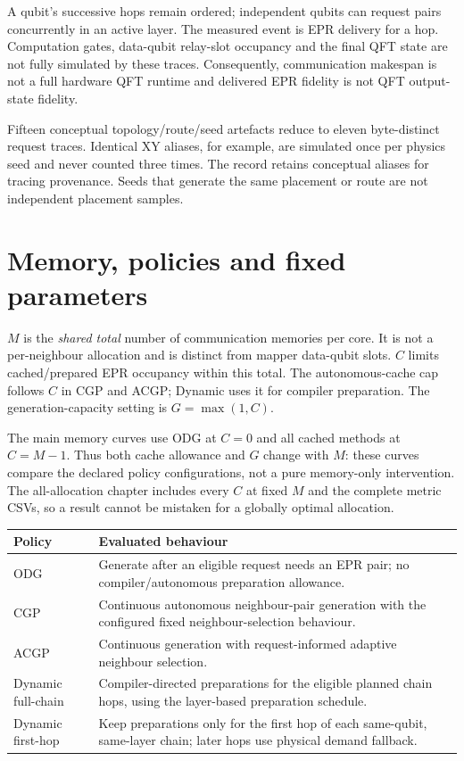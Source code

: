 \documentclass[10pt,a4paper,oneside]{report}
\begin{document}
A qubit's successive hops remain ordered; independent qubits can request pairs concurrently in an active layer. The measured event is EPR delivery for a hop. Computation gates, data-qubit relay-slot occupancy and the final QFT state are not fully simulated by these traces. Consequently, communication makespan is not a full hardware QFT runtime and delivered EPR fidelity is not QFT output-state fidelity.

Fifteen conceptual topology/route/seed artefacts reduce to eleven byte-distinct request traces. Identical XY aliases, for example, are simulated once per physics seed and never counted three times. The record retains conceptual aliases for tracing provenance. Seeds that generate the same placement or route are not independent placement samples.

\clearpage
\section{Memory, policies and fixed parameters}
$M$ is the \emph{shared total} number of communication memories per core. It is not a per-neighbour allocation and is distinct from mapper data-qubit slots. $C$ limits cached/prepared EPR occupancy within this total. The autonomous-cache cap follows $C$ in CGP and ACGP; Dynamic uses it for compiler preparation. The generation-capacity setting is $G=\max(1,C)$.

The main memory curves use ODG at $C=0$ and all cached methods at $C=M-1$. Thus both cache allowance and $G$ change with $M$: these curves compare the declared policy configurations, not a pure memory-only intervention. The all-allocation chapter includes every $C$ at fixed $M$ and the complete metric CSVs, so a result cannot be mistaken for a globally optimal allocation.

\begin{center}\small
\begin{tabular}{p{.22\linewidth}p{.68\linewidth}}\toprule
Policy & Evaluated behaviour\\\midrule
ODG & Generate after an eligible request needs an EPR pair; no compiler/autonomous preparation allowance.\\
CGP & Continuous autonomous neighbour-pair generation with the configured fixed neighbour-selection behaviour.\\
ACGP & Continuous generation with request-informed adaptive neighbour selection.\\
Dynamic full-chain & Compiler-directed preparations for the eligible planned chain hops, using the layer-based preparation schedule.\\
Dynamic first-hop & Keep preparations only for the first hop of each same-qubit, same-layer chain; later hops use physical demand fallback.\\\bottomrule
\end{tabular}\end{center}
\end{document}

